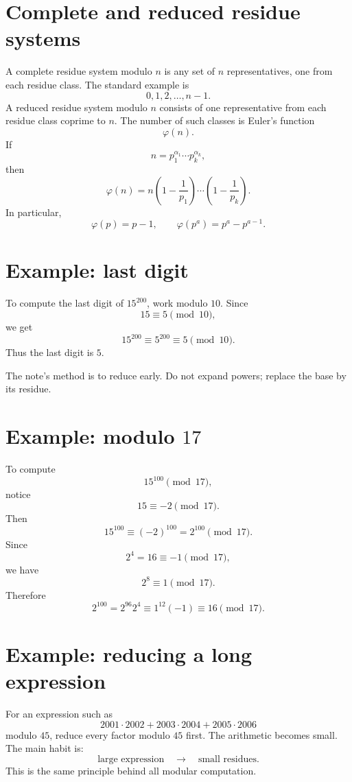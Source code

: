 \section{Complete and reduced residue systems}

A complete residue system modulo \(n\) is any set of \(n\) representatives, one from each residue class.  The standard example is
\[
  0,1,2,\ldots,n-1.
\]
A reduced residue system modulo \(n\) consists of one representative from each residue class coprime to \(n\).  The number of such classes is Euler's function
\[
  \varphi(n).
\]
If
\[
  n=p_1^{\alpha_1}\cdots p_k^{\alpha_k},
\]
then
\[
  \varphi(n)=n\left(1-\frac1{p_1}\right)\cdots\left(1-\frac1{p_k}\right).
\]
In particular,
\[
  \varphi(p)=p-1,\qquad \varphi(p^a)=p^a-p^{a-1}.
\]

\section{Example: last digit}

To compute the last digit of \(15^{200}\), work modulo \(10\).  Since
\[
  15\equiv5\pmod{10},
\]
we get
\[
  15^{200}\equiv5^{200}\equiv5\pmod{10}.
\]
Thus the last digit is \(5\).

The note's method is to reduce early.  Do not expand powers; replace the base by its residue.

\section[Example: modulo 17]{Example: modulo \(17\)}

To compute
\[
  15^{100}\pmod{17},
\]
notice
\[
  15\equiv-2\pmod{17}.
\]
Then
\[
  15^{100}\equiv (-2)^{100}=2^{100}\pmod{17}.
\]
Since
\[
  2^4=16\equiv-1\pmod{17},
\]
we have
\[
  2^8\equiv1\pmod{17}.
\]
Therefore
\[
  2^{100}=2^{96}2^4\equiv1^{12}(-1)\equiv16\pmod{17}.
\]

\section{Example: reducing a long expression}

For an expression such as
\[
  2001\cdot2002+2003\cdot2004+2005\cdot2006
\]
modulo \(45\), reduce every factor modulo \(45\) first.  The arithmetic becomes small.  The main habit is:
\[
  \text{large expression}\quad\longrightarrow\quad\text{small residues}.
\]
This is the same principle behind all modular computation.

